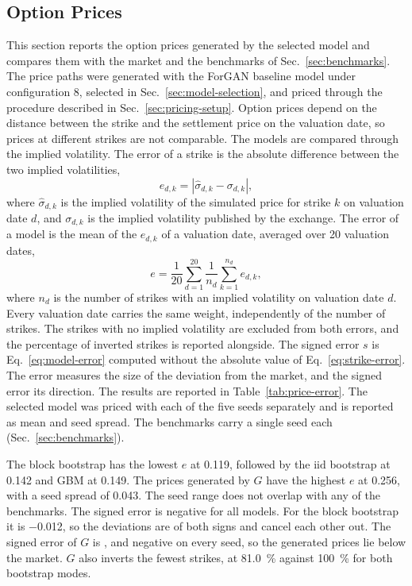 \subsection{Option Prices}\label{sec:option-prices}
This section reports the option prices generated by the selected model and compares them with the market and the benchmarks of Sec.~\ref{sec:benchmarks}. The price paths were generated with the ForGAN baseline model under configuration 8, selected in Sec.~\ref{sec:model-selection}, and priced through the procedure described in Sec.~\ref{sec:pricing-setup}. Option prices depend on the distance between the strike and the settlement price on the valuation date, so prices at different strikes are not comparable. The models are compared through the implied volatility. The error of a strike is the absolute difference between the two implied volatilities,
\begin{equation}
    e_{d,k} = \left| \hat{\sigma}_{d,k} - \sigma_{d,k} \right|,
    \label{eq:strike-error}
\end{equation}
where $\hat{\sigma}_{d,k}$ is the implied volatility of the simulated price for strike $k$ on valuation date $d$, and $\sigma_{d,k}$ is the implied volatility published by the exchange. The error of a model is the mean of the $e_{d,k}$ of a valuation date, averaged over \num{20} valuation dates,
\begin{equation}
    e = \frac{1}{20} \sum_{d=1}^{20} \frac{1}{n_d} \sum_{k=1}^{n_d} e_{d,k},
    \label{eq:model-error}
\end{equation}
where $n_d$ is the number of strikes with an implied volatility on valuation date $d$. Every valuation date carries the same weight, independently of the number of strikes. The strikes with no implied volatility are excluded from both errors, and the percentage of inverted strikes is reported alongside. The signed error $s$ is Eq.~\eqref{eq:model-error} computed without the absolute value of Eq.~\eqref{eq:strike-error}. The error measures the size of the deviation from the market, and the signed error its direction. The results are reported in Table~\ref{tab:price-error}. The selected model was priced with each of the five seeds separately and is reported as mean and seed spread. The benchmarks carry a single seed each (Sec.~\ref{sec:benchmarks}).

The block bootstrap has the lowest $e$ at \num{0.119}, followed by the $\mathrm{iid}$ bootstrap at \num{0.142} and GBM at \num{0.149}. The prices generated by $G$ have the highest $e$ at \num{0.256}, with a seed spread of \num{0.043}. The seed range does not overlap with any of the benchmarks. The signed error is negative for all models. For the block bootstrap it is \num{-0.012}, so the deviations are of both signs and cancel each other out. The signed error of $G$ is , and negative on every seed, so the generated prices lie below the market. $G$ also inverts the fewest strikes, at \SI{81.0}{\percent} against \SI{100}{\percent} for both bootstrap modes.

